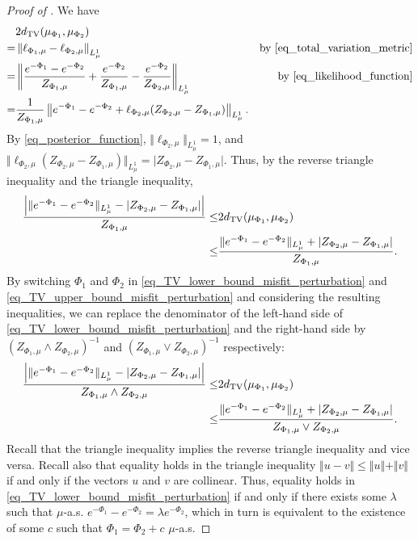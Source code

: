 \documentclass[a4paper]{scrartcl}
\theoremstyle{definition}
\numberwithin{equation}{section}
\newcommand{\abs}[1]{\vert #1\vert}
\newcommand{\Abs}[1]{\left\vert#1\right\vert}
\newcommand{\norm}[1]{\Vert #1 \Vert}
\newcommand{\Norm}[1]{\left\Vert #1 \right\Vert}
\newcommand{\TV}[0]{\textup{TV}}
\begin{document}
\TVboundsMisfitperturbationsTriangle*
\begin{proof}[Proof of ]
We have
\begin{align*}
  &2d_{\TV}(\mu_{\Phi_1},\mu_{\Phi_2})
  \\
  = &\Norm{\ell_{\Phi_1,\mu}-\ell_{\Phi_2,\mu}}_{L^1_\mu} & \text{by \eqref{eq_total_variation_metric}}
  \\
  =& \Norm{\frac{e^{-\Phi_1}-e^{-\Phi_2}}{Z_{\Phi_1,\mu}}+\frac{e^{-\Phi_2}}{Z_{\Phi_1,\mu}}-\frac{e^{-\Phi_2}}{Z_{\Phi_2,\mu}}}_{L^1_\mu} & \text{by \eqref{eq_likelihood_function}}
  \\
  =& \frac{1}{Z_{\Phi_1,\mu}}\Norm{e^{-\Phi_1}-e^{-\Phi_2}+\ell_{\Phi_2,\mu} (Z_{\Phi_2,\mu}-Z_{\Phi_1,\mu})}_{L^1_\mu}.
  \end{align*}
  By \eqref{eq_posterior_function}, $\norm{\ell_{\Phi_2,\mu}}_{L^1_\mu}=1$, and $\norm{\ell_{\Phi_2,\mu}(Z_{\Phi_2,\mu}-Z_{\Phi_1,\mu})}_{L^1_\mu}=\abs{Z_{\Phi_2,\mu}-Z_{\Phi_1,\mu}}$.
  Thus, by the reverse triangle inequality and the triangle inequality,
  \begin{subequations}
   \begin{align}
  \frac{\Abs{\norm{ e^{-\Phi_1}-e^{-\Phi_2}}_{L^1_\mu}- \abs{Z_{\Phi_2,\mu}-Z_{\Phi_1,\mu}}}}{Z_{\Phi_1,\mu}}  
  \leq &2d_{\TV}(\mu_{\Phi_1},\mu_{\Phi_2})
  \label{eq_TV_lower_bound_misfit_perturbation}
  \\
  \leq &\frac{\norm{ e^{-\Phi_1}-e^{-\Phi_2}}_{L^1_\mu}+ \abs{Z_{\Phi_2,\mu}-Z_{\Phi_1,\mu}}}{Z_{\Phi_1,\mu}}.
  \label{eq_TV_upper_bound_misfit_perturbation}
  \end{align}
  \end{subequations}
  By switching $\Phi_1$ and $\Phi_2$ in \eqref{eq_TV_lower_bound_misfit_perturbation} and \eqref{eq_TV_upper_bound_misfit_perturbation} and considering the resulting inequalities, we can replace the denominator of the left-hand side of \eqref{eq_TV_lower_bound_misfit_perturbation} and the right-hand side by $(Z_{\Phi_1,\mu}\wedge Z_{\Phi_2,\mu})^{-1}$ and $(Z_{\Phi_1,\mu}\vee Z_{\Phi_2,\mu})^{-1}$ respectively:
  \begin{align*}
  \frac{\Abs{\norm{ e^{-\Phi_1}-e^{-\Phi_2}}_{L^1_\mu}- \abs{Z_{\Phi_2,\mu}-Z_{\Phi_1,\mu}}}}{Z_{\Phi_1,\mu}\wedge Z_{\Phi_2,\mu}}  
  \leq &2d_{\TV}(\mu_{\Phi_1},\mu_{\Phi_2})
  \\
  \leq &\frac{\norm{ e^{-\Phi_1}-e^{-\Phi_2}}_{L^1_\mu}+ \abs{Z_{\Phi_2,\mu}-Z_{\Phi_1,\mu}}}{Z_{\Phi_1,\mu}\vee Z_{\Phi_2,\mu}}.
  \end{align*}
Recall that the triangle inequality implies the reverse triangle inequality and vice versa.
Recall also that equality holds in the triangle inequality $\norm{u-v}\leq \norm{u}+\norm{v}$ if and only if the vectors $u$ and $v$ are collinear.
Thus, equality holds in \eqref{eq_TV_lower_bound_misfit_perturbation} if and only if there exists some $\lambda$ such that $\mu$-a.s. $e^{-\Phi_1}-e^{-\Phi_2}=\lambda e^{-\Phi_2}$, which in turn is equivalent to the existence of some $c$ such that $\Phi_1=\Phi_2+c$ $\mu$-a.s.


\end{proof}
\end{document}

